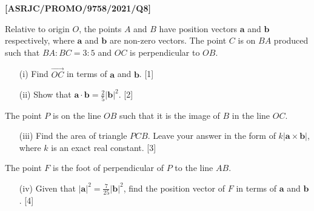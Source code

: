 \item \textbf{{[}ASRJC/PROMO/9758/2021/Q8{]} }

Relative to origin $O$, the points $A$ and $B$ have position vectors
$\mathbf{a}$ and $\mathbf{b}$ respectively, where $\mathbf{a}$
and $\mathbf{b}$ are non-zero vectors. The point $C$ is on $BA$
produced such that $BA:BC=3:5$ and $OC$ is perpendicular to $OB$. 
\begin{enumerate}
\item[(i)]  Find $\overrightarrow{OC}$ in terms of $\mathbf{a}$ and $\mathbf{b}$.\hfill{}
{[}1{]}
\item[(ii)]  Show that $\mathbf{a}\cdot\mathbf{b}=\frac{2}{5}\left|\mathbf{b}\right|^{2}$.\hfill{}
{[}2{]}
\end{enumerate}
The point $P$ is on the line $OB$ such that it is the image of $B$
in the line $OC$. 
\begin{enumerate}
\item[(iii)]  Find the area of triangle $PCB$. Leave your answer in the form
of $k\left|\mathbf{a}\times\mathbf{b}\right|$, where $k$ is an exact
real constant. \hfill{}{[}3{]}
\end{enumerate}
The point $F$ is the foot of perpendicular of $P$ to the line $AB$. 
\begin{enumerate}
\item[(iv)]  Given that $\left|\mathbf{a}\right|^{2}=\frac{7}{25}\left|\mathbf{b}\right|^{2}$,
find the position vector of $F$ in terms of $\mathbf{a}$ and $\mathbf{b}$.
\hfill{}{[}4{]}
\end{enumerate}